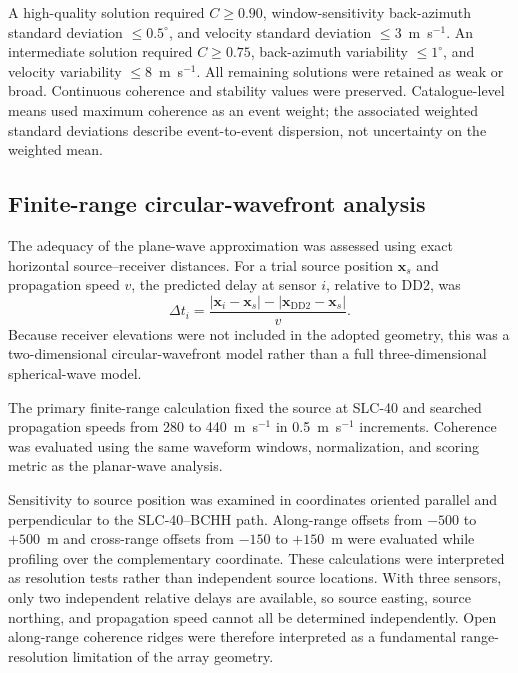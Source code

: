 \documentclass[]{seismica}
\begin{document}
A high-quality solution required $C\geq0.90$, window-sensitivity back-azimuth
standard deviation $\leq0.5^\circ$, and velocity standard deviation
$\leq3$~m~s$^{-1}$. An intermediate solution required $C\geq0.75$,
back-azimuth variability $\leq1^\circ$, and velocity variability
$\leq8$~m~s$^{-1}$. All remaining solutions were retained as weak or broad.
Continuous coherence and stability values were preserved. Catalogue-level
means used maximum coherence as an event weight; the associated weighted
standard deviations describe event-to-event dispersion, not uncertainty on the
weighted mean.

\subsection{Finite-range circular-wavefront analysis}

The adequacy of the plane-wave approximation was assessed using exact horizontal source--receiver distances. For a trial source position $\mathbf{x}_s$ and propagation speed $v$, the predicted delay at sensor $i$, relative to DD2, was
\begin{equation}
  \Delta t_i = \frac{|\mathbf{x}_i-\mathbf{x}_s|-|\mathbf{x}_{\mathrm{DD2}}-\mathbf{x}_s|}{v}.
  \label{eq:circular_delay}
\end{equation}
Because receiver elevations were not included in the adopted geometry, this was a two-dimensional circular-wavefront model rather than a full three-dimensional spherical-wave model.

The primary finite-range calculation fixed the source at SLC-40 and searched propagation speeds from 280 to 440~m~s$^{-1}$ in 0.5~m~s$^{-1}$ increments. Coherence was evaluated using the same waveform windows, normalization, and scoring metric as the planar-wave analysis.

Sensitivity to source position was examined in coordinates oriented parallel and perpendicular to the SLC-40--BCHH path. Along-range offsets from $-500$ to $+500$~m and cross-range offsets from $-150$ to $+150$~m were evaluated while profiling over the complementary coordinate. These calculations were interpreted as resolution tests rather than independent source locations. With three sensors, only two independent relative delays are available, so source easting, source northing, and propagation speed cannot all be determined independently. Open along-range coherence ridges were therefore interpreted as a fundamental range-resolution limitation of the array geometry.
\end{document}
